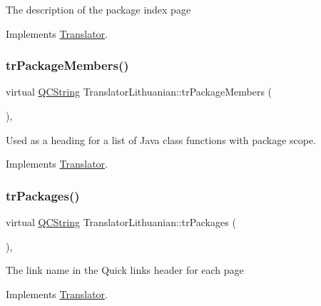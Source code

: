The description of the package index page 

Implements \mbox{\hyperlink{class_translator}{Translator}}.

\mbox{\label{class_translator_lithuanian_a42c60297a95fbea912c40924489b2b60}} 
\subsubsection{\texorpdfstring{trPackageMembers()}{trPackageMembers()}}
{\footnotesize\ttfamily virtual \mbox{\hyperlink{class_q_c_string}{Q\+C\+String}} Translator\+Lithuanian\+::tr\+Package\+Members (\begin{DoxyParamCaption}{ }\end{DoxyParamCaption})\hspace{0.3cm}{\ttfamily [inline]}, {\ttfamily [virtual]}}

Used as a heading for a list of Java class functions with package scope. 

Implements \mbox{\hyperlink{class_translator}{Translator}}.

\mbox{\label{class_translator_lithuanian_a385fcf39733e653a4064ce82cfe40081}} 
\subsubsection{\texorpdfstring{trPackages()}{trPackages()}}
{\footnotesize\ttfamily virtual \mbox{\hyperlink{class_q_c_string}{Q\+C\+String}} Translator\+Lithuanian\+::tr\+Packages (\begin{DoxyParamCaption}{ }\end{DoxyParamCaption})\hspace{0.3cm}{\ttfamily [inline]}, {\ttfamily [virtual]}}

The link name in the Quick links header for each page 

Implements \mbox{\hyperlink{class_translator}{Translator}}.

\mbox{\label{class_translator_lithuanian_ac0e6ffbf257eb500c574403899853e53}} 
